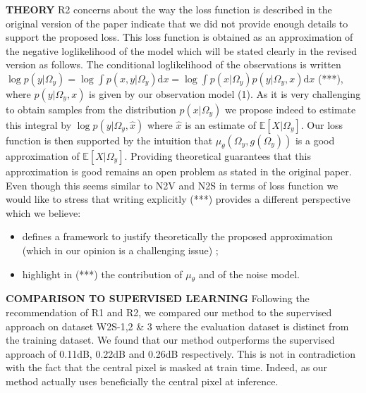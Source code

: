 \documentclass{article}
\begin{document}
\textbf{THEORY}
R2 concerns about the way the loss function is described in the original version of the paper indicate that we did not provide enough details to support the proposed loss. This loss function is obtained as an approximation of the negative loglikelihood of the model which will be stated clearly in the revised version as follows.
The conditional loglikelihood of the observations is written $ \log p(y|\Omega_y) = \log \int p(x,y|\Omega_y) \mathrm{d}x = \log \int p(x|\Omega_y)p(y|\Omega_y,x) \mathrm{d}x$ (***), where $p(y|\Omega_y,x)$ is given by our observation model (1).
As it is very challenging to obtain samples from the distribution $p(x|\Omega_y)$ we propose indeed to estimate this integral by $\log p(y|\Omega_y,\hat {x})$ where $\hat {x}$ is an estimate of $\mathbb{E}[X|\Omega_y]$. Our loss function is then supported by the intuition that $\mu_\theta(\Omega_y,g(\Omega_y))$ is a good approximation of $\mathbb{E}[X|\Omega_y]$. Providing theoretical guarantees  that this approximation is good remains an open problem as stated in the original paper. Even though this seems similar to N2V and N2S in terms of loss function we would like to stress that writing explicitly (***) provides a different perspective which we believe:
\begin{itemize}
  \item defines a framework to justify theoretically the proposed approximation (which in our opinion is a challenging issue) ;
  \item highlight in (***) the contribution of $\mu_\theta$ and of the noise model.
\end{itemize}

\textbf{COMPARISON TO SUPERVISED LEARNING}
Following the recommendation of R1 and R2, we compared our method to the supervised approach on dataset W2S-1,2 \& 3 where the evaluation dataset is distinct from the training dataset. We found that our method outperforms the supervised approach of 0.11dB, 0.22dB and 0.26dB respectively. This is not in contradiction with the fact that the central pixel is masked at train time. Indeed, as our method actually uses beneficially the central pixel at inference.

\end{document}
